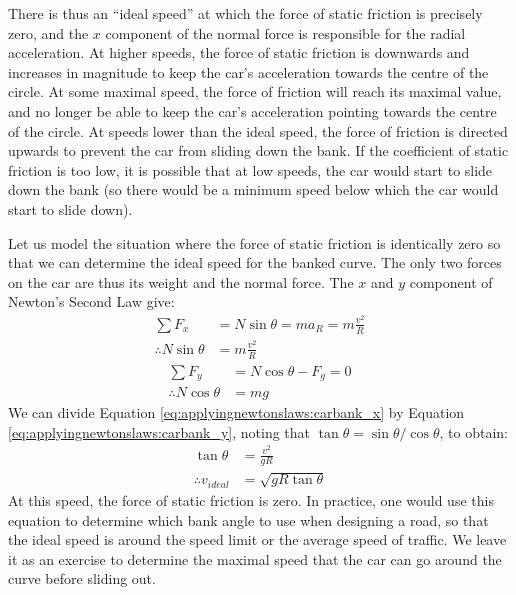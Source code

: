 There is thus an ``ideal speed'' at which the force of static friction is precisely zero, and the $x$ component of the normal force is responsible for the radial acceleration. At higher speeds, the force of static friction is downwards and increases in magnitude to keep the car's acceleration towards the centre of the circle. At some maximal  speed, the force of friction will reach its maximal value, and no longer be able to keep the car's acceleration pointing towards the centre of the circle. At speeds lower than the ideal speed, the force of friction is directed upwards to prevent the car from sliding down the bank. If the coefficient of static friction is too low, it is possible that at low speeds, the car would start to slide down the bank (so there would be a minimum speed below which the car would start to slide down). 

Let us model the situation where the force of static friction is identically zero so that we can determine the ideal speed for the banked curve. The only two forces on the car are thus its weight and the normal force. The $x$ and $y$ component of Newton's Second Law give:
\begin{align}
\label{eq:applyingnewtonslaws:carbank_x}
\sum F_x &= N\sin\theta = ma_R=m\frac{v^2}{R}\nonumber\\
\therefore N\sin\theta &= m\frac{v^2}{R}
\end{align}
\begin{align}
\label{eq:applyingnewtonslaws:carbank_y}
\sum F_y &= N\cos\theta-F_g = 0\nonumber\\
\therefore N\cos\theta&=mg
\end{align}
We can divide Equation \ref{eq:applyingnewtonslaws:carbank_x} by Equation \ref{eq:applyingnewtonslaws:carbank_y}, noting that $\tan\theta=\sin\theta/\cos\theta$, to obtain:
\begin{align*}
\tan\theta &= \frac{v^2}{gR}\\
\therefore v_{ideal} &=\sqrt{gR\tan\theta}
\end{align*}
At this speed, the force of static friction is zero. In practice, one would use this equation to determine which bank angle to use when designing a road, so that the ideal speed is around the speed limit or the average speed of traffic. We leave it as an exercise to determine the maximal speed that the car can go around the curve before sliding out.


